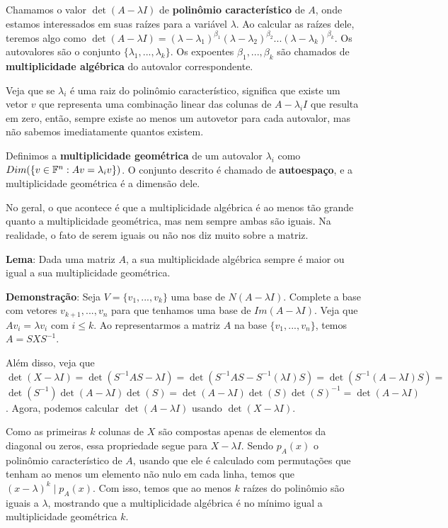 \documentclass[11pt, a4paper]{article}
\begin{document}
Chamamos o valor \(\det(A-\lambda I)\) de \textbf{polinômio característico} de \(A\), onde estamos interessados em suas raízes para a variável \(\lambda\). Ao calcular as raízes dele, teremos algo como \(\det(A-\lambda I)=(\lambda - \lambda_1)^{\beta_1}(\lambda - \lambda_2)^{\beta_2}...(\lambda - \lambda_k)^{\beta_k}\). Os autovalores são o conjunto \(\{\lambda_1,...,\lambda_k\}\). Os expoentes \(\beta_1,...,\beta_k\) são chamados de \textbf{multiplicidade algébrica} do autovalor correspondente.

Veja que se \(\lambda_i\) é uma raiz do polinômio característico, significa que existe um vetor \(v\) que representa uma combinação linear das colunas de \(A-\lambda_i I\) que resulta em zero, então, sempre existe ao menos um autovetor para cada autovalor, mas não sabemos imediatamente quantos existem. 

Definimos a \textbf{multiplicidade geométrica} de um autovalor \(\lambda_i\) como \(Dim(\{v\in \mathbb{F}^n : Av=\lambda_iv\})\). O conjunto descrito é chamado de \textbf{autoespaço}, e a multiplicidade geométrica é a dimensão dele.

No geral, o que acontece é que a multiplicidade algébrica é ao menos tão grande quanto a multiplicidade geométrica, mas nem sempre ambas são iguais. Na realidade, o fato de serem iguais ou não nos diz muito sobre a matriz.

\textbf{Lema}: Dada uma matriz \(A\), a sua multiplicidade algébrica sempre é maior ou igual a sua multiplicidade geométrica.

\textbf{Demonstração}: Seja \(V=\{v_1,...,v_k\}\) uma base de \(N(A-\lambda I)\). Complete a base com vetores \(v_{k+1},...,v_n\) para que tenhamos uma base de \(Im(A-\lambda  I)\). Veja que \(Av_i=\lambda v_i\) com \(i\leq k\). Ao representarmos a matriz \(A\) na base \(\{v_1,...,v_n\}\), temos \(A=SXS^{-1}\). 

Além disso, veja que \(\det(X-\lambda I)=\det(S^{-1}AS-\lambda I)=\det(S^{-1}AS-S^{-1}(\lambda I)S)=\det(S^{-1}(A -\lambda I)S)=\) \(\det(S^{-1})\det(A-\lambda I)\det(S)=\det(A-\lambda I)\det(S)\det(S)^{-1}=\det(A-\lambda I)\). Agora, podemos calcular \(\det(A-\lambda I)\) usando \(\det(X-\lambda I)\).

Como as primeiras \(k\) colunas de \(X\) são compostas apenas de elementos da diagonal ou zeros, essa propriedade segue para \(X-\lambda I\). Sendo \(p_A(x)\) o polinômio característico de \(A\), usando que ele é calculado com permutações que tenham ao menos um elemento não nulo em cada linha, temos que \((x-\lambda)^k\mid p_A(x)\). Com isso, temos que ao menos \(k\) raízes do polinômio são iguais a \(\lambda\), mostrando que a multiplicidade algébrica é no mínimo igual a multiplicidade geométrica \(k\).
\end{document}
